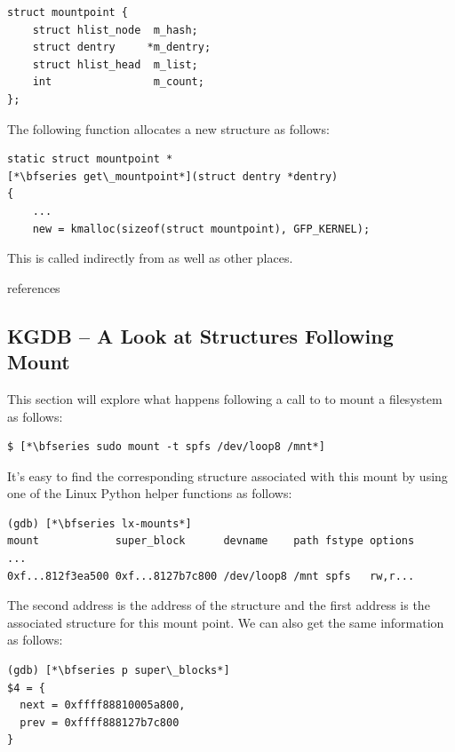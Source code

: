 \begin{lstlisting}
struct mountpoint {
    struct hlist_node  m_hash;
    struct dentry     *m_dentry;
    struct hlist_head  m_list;
    int                m_count;
};
\end{lstlisting}

\noindent
The following function allocates a new  structure as follows:

\begin{lstlisting}
static struct mountpoint *
[*\bfseries get\_mountpoint*](struct dentry *dentry)
{
    ...
    new = kmalloc(sizeof(struct mountpoint), GFP_KERNEL);
\end{lstlisting}

\noindent
This is called indirectly from  as well as other places.

references



\subsection{KGDB -- A Look at Structures Following Mount}

This section will explore what happens following a call to  to mount a filesystem as follows:

\begin{lstlisting}
$ [*\bfseries sudo mount -t spfs /dev/loop8 /mnt*]
\end{lstlisting}

\noindent
It's easy to find the corresponding  structure associated with this mount by using one of the Linux Python helper functions as follows:

\begin{lstlisting}
(gdb) [*\bfseries lx-mounts*]
mount            super_block      devname    path fstype options
...
0xf...812f3ea500 0xf...8127b7c800 /dev/loop8 /mnt spfs   rw,r...
\end{lstlisting}

\noindent
The second address is the address of the  structure and the first address is the associated  structure for this mount point. We can also get the same information as follows:
\begin{lstlisting}
(gdb) [*\bfseries p super\_blocks*]
$4 = {
  next = 0xffff88810005a800,
  prev = 0xffff888127b7c800 
}
\end{lstlisting}

